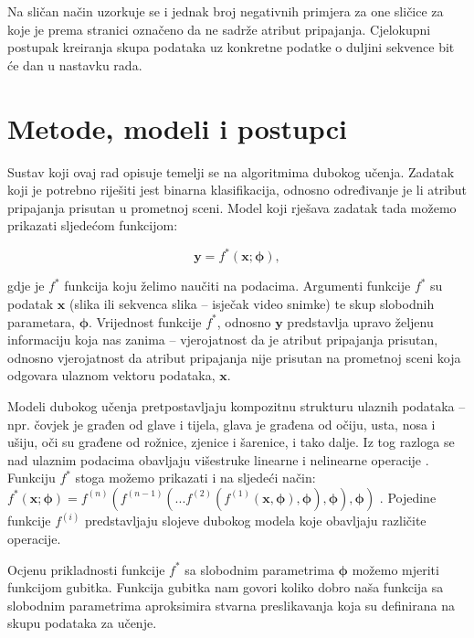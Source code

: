 \documentclass[times, utf8, diplomski, numeric]{fer}
\begin{document}
\noindent Na sličan način uzorkuje se i jednak broj negativnih primjera za one sličice za koje je prema stranici \citep{url:ftts_irap} označeno da ne sadrže atribut pripajanja.
Cjelokupni postupak kreiranja skupa podataka uz konkretne podatke o duljini sekvence bit će dan u nastavku rada.

\chapter{Metode, modeli i postupci} \label{chapter:methods}
Sustav koji ovaj rad opisuje temelji se na algoritmima dubokog učenja. 
Zadatak koji je potrebno riješiti jest binarna klasifikacija, odnosno određivanje je li atribut pripajanja prisutan u prometnoj sceni.
Model koji rješava zadatak tada možemo prikazati sljedećom funkcijom:

\begin{equation}
 \mathbf{y} = f^*(\mathbf{x}; \boldsymbol{\phi}),
\end{equation}

\noindent gdje je $f^*$ funkcija koju želimo naučiti na podacima. Argumenti funkcije $f^*$ su podatak $\mathbf{x}$ (slika ili sekvenca slika -- isječak video snimke) te skup slobodnih parametara, $\boldsymbol{\phi}$.
Vrijednost funkcije $f^*$, odnosno $\mathbf{y}$ predstavlja upravo željenu informaciju koja nas zanima -- vjerojatnost da je atribut pripajanja prisutan, odnosno vjerojatnost da atribut pripajanja nije prisutan na prometnoj sceni koja odgovara ulaznom vektoru podataka, $\mathbf{x}$.

Modeli dubokog učenja pretpostavljaju kompozitnu strukturu ulaznih podataka -- npr. čovjek je građen od glave i tijela, glava je građena od očiju, usta, nosa i ušiju, oči su građene od rožnice, zjenice i šarenice, i tako dalje.
Iz tog razloga se nad ulaznim podacima obavljaju višestruke linearne i nelinearne operacije \citep{pdf:duboko_0}.
Funkciju $f^*$ stoga možemo prikazati i na sljedeći način:
$f^*(\mathbf{x}; \boldsymbol{\phi})=f^{(n)}(f^{(n-1)}(...f^{(2)}(f^{(1)}(\mathbf{x}, \boldsymbol{\phi}), \boldsymbol{\phi}), \boldsymbol{\phi}), \boldsymbol{\phi})$ \citep{book:deeplearningbook}.
Pojedine funkcije $f^{(i)}$ predstavljaju slojeve dubokog modela koje obavljaju različite operacije.

Ocjenu prikladnosti funkcije $f^*$ sa slobodnim parametrima $\boldsymbol{\phi}$ možemo mjeriti funkcijom gubitka. 
Funkcija gubitka nam govori koliko dobro naša funkcija sa slobodnim parametrima aproksimira stvarna preslikavanja koja su definirana na skupu podataka za učenje.
\end{document}
